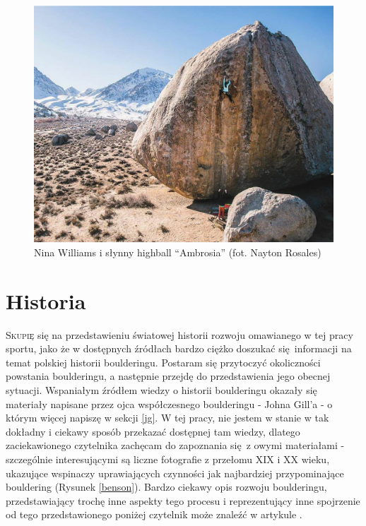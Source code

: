 \documentclass{article}
\begin{document}
\begin{figure}[!htbp]
	\begin{center}
		\includegraphics[width=0.7\linewidth]{images/nina-williams-abrosia.eps}
	\end{center}
	\caption{Nina Williams i słynny highball “Ambrosia” (fot. Nayton Rosales) \cite{nina}}
	\label{ambrosia}
\end{figure}

\section{Historia}
\lettrine[lines=2]{S}{kupię} się na przedstawieniu światowej historii rozwoju omawianego w tej pracy sportu, jako że w dostępnych źródłach bardzo ciężko doszukać się informacji na temat polskiej historii boulderingu. Postaram się przytoczyć okoliczności powstania boulderingu, a następnie przejdę do przedstawienia jego obecnej sytuacji. Wspaniałym źródłem wiedzy o historii boulderingu okazały się materiały \cite{gill-history} napisane przez ojca współczesnego boulderingu - Johna Gill'a - o którym więcej napiszę w sekcji \ref{jg}. W tej pracy, nie jestem w stanie w tak dokładny i ciekawy sposób przekazać dostępnej tam wiedzy, dlatego zaciekawionego czytelnika zachęcam do zapoznania się z owymi materiałami - szczególnie interesującymi są liczne fotografie z przełomu XIX i XX wieku, ukazujące wspinaczy uprawiających czynności jak najbardziej przypominające bouldering (Rysunek \ref{benson}). Bardzo ciekawy opis rozwoju boulderingu, przedstawiający trochę inne aspekty tego procesu i reprezentujący inne spojrzenie od tego przedstawionego poniżej czytelnik może znaleźć w artykule \cite{pg-hist}.
\end{document}
